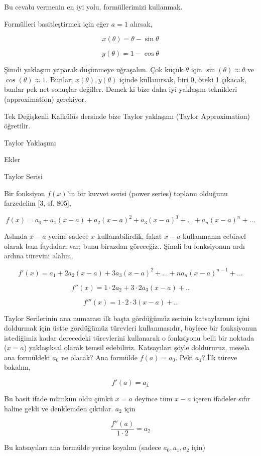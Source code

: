 \documentclass[12pt,fleqn]{article}\usepackage{../../common}
\begin{document}
Bu cevabı vermenin en iyi yolu, formüllerimizi kullanmak. 

Formülleri basitleştirmek için eğer $a=1$ alırsak, 

$$ x(\theta) = \theta - \sin \theta $$

$$ y(\theta) = 1 - \cos \theta $$

Şimdi yaklaşım yaparak düşünmeye uğraşalım. Çok küçük $\theta$ için
$\sin(\theta) \approx \theta$ ve $\cos(\theta) \approx 1$. Bunları $x(\theta),
y(\theta)$ içinde kullanırsak, biri 0, öteki 1 çıkacak, bunlar pek net sonuçlar
değiller. Demek ki bize daha iyi yaklaşım teknikleri (approximation) gerekiyor.

Tek Değişkenli Kalkülüs dersinde bize Taylor yaklaşımı (Taylor Approximation) 
öğretilir. 

Taylor Yaklaşımı

Ekler

Taylor Serisi

Bir fonksiyon $f(x)$'in bir kuvvet serisi (power series) toplamı olduğunu
farzedelim [3, sf. 805], 

$$ f(x) = a_0 + a_1(x-a) + a_2(x-a)^2 + a_3(x-a)^3 + ... + a_n (x-a)^n + ...$$

Aslında $x-a$ yerine sadece $x$ kullanabilirdik, fakat $x-a$ kullanmanın
cebirsel olarak bazı faydaları var; bunu birazdan göreceğiz.. Şimdi bu
fonksiyonun ardı ardına türevini alalım,

$$ f'(x) = a_1 +  2a_2(x-a) + 3a_3(x-a)^2 + ... + n a_n(x-a)^{n-1} + ...$$

$$ f''(x) = 1 \cdot 2a_2 + 3 \cdot 2a_3(x-a) + .. $$

$$ f'''(x) =  1 \cdot 2 \cdot 3 (x-a) + .. $$

Taylor Serilerinin ana numarası ilk başta gördüğümüz serinin katsaylarının içini
doldurmak için üstte gördüğümüz türevleri kullanmasıdır, böylece bir fonksiyonun
istediğimiz kadar derecedeki türevlerini kullanarak o fonksiyonu belli bir
noktada ($x=a$) yaklaşıksal olarak temsil edebiliriz. Katsayıları şöyle
doldururuz, mesela ana formüldeki $a_0$ ne olacak? Ana formülde $f(a)=a_0$. Peki
$a_1$? İlk türeve bakalım,

$$ f'(a) = a_1  $$

Bu basit ifade mümkün oldu çünkü $x=a$ deyince tüm $x-a$ içeren ifadeler
sıfır haline geldi ve denklemden çıktılar. $a_2$ için

$$ \frac{f''(a)}{1 \cdot 2} = a_2  $$

Bu katsayıları ana formülde yerine koyalım (sadece $a_0,a_1,a_2$ için)
\end{document}
